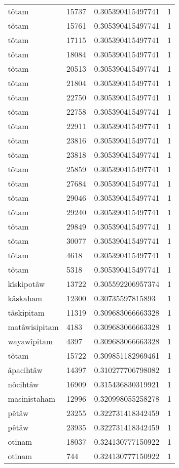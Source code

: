 \begin{longtable}{llll}
tôtam & 15737 & 0.305390415497741 & 1 \\
tôtam & 15761 & 0.305390415497741 & 1 \\
tôtam & 17115 & 0.305390415497741 & 1 \\
tôtam & 18084 & 0.305390415497741 & 1 \\
tôtam & 20513 & 0.305390415497741 & 1 \\
tôtam & 21804 & 0.305390415497741 & 1 \\
tôtam & 22750 & 0.305390415497741 & 1 \\
tôtam & 22758 & 0.305390415497741 & 1 \\
tôtam & 22911 & 0.305390415497741 & 1 \\
tôtam & 23816 & 0.305390415497741 & 1 \\
tôtam & 23818 & 0.305390415497741 & 1 \\
tôtam & 25859 & 0.305390415497741 & 1 \\
tôtam & 27684 & 0.305390415497741 & 1 \\
tôtam & 29046 & 0.305390415497741 & 1 \\
tôtam & 29240 & 0.305390415497741 & 1 \\
tôtam & 29849 & 0.305390415497741 & 1 \\
tôtam & 30077 & 0.305390415497741 & 1 \\
tôtam & 4618 & 0.305390415497741 & 1 \\
tôtam & 5318 & 0.305390415497741 & 1 \\
kîskipotâw & 13722 & 0.305592206957374 & 1 \\
kâskaham & 12300 & 0.30735597815893 & 1 \\
tâskipitam & 11319 & 0.309683066663328 & 1 \\
matâwisipitam & 4183 & 0.309683066663328 & 1 \\
wayawîpitam & 4397 & 0.309683066663328 & 1 \\
tôtam & 15722 & 0.309851182969461 & 1 \\
âpacihtâw & 14397 & 0.310277706798082 & 1 \\
nôcihtâw & 16909 & 0.315436830319921 & 1 \\
masinistaham & 12996 & 0.320998055258278 & 1 \\
pêtâw & 23255 & 0.322731418342459 & 1 \\
pêtâw & 23935 & 0.322731418342459 & 1 \\
otinam & 18037 & 0.324130777150922 & 1 \\
otinam & 744 & 0.324130777150922 & 1 \\

\end{longtable}
